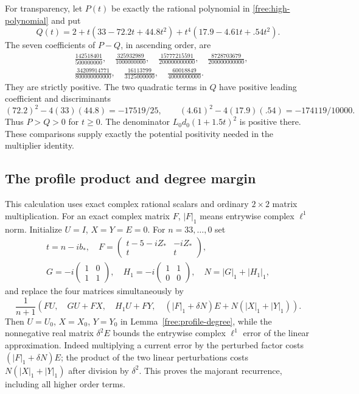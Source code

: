 For transparency, let $P(t)$ be exactly the rational polynomial in
\eqref{free:high-polynomial} and put
\[
 Q(t)=2+t(33-72.2t+44.8t^2)+t^4(17.9-4.61t+.54t^2).
\]
The seven coefficients of $P-Q$, in ascending order, are
\begin{equation}\label{cert:high-difference}
 \begin{split}
 &\frac{142518401}{500000000},\quad
 \frac{325932989}{1000000000},\quad
 \frac{15777215591}{200000000000},\quad
 \frac{8728703679}{200000000000},\\
 &\frac{34209914771}{800000000000},\quad
 \frac{16113799}{3125000000},\quad
 \frac{60018849}{40000000000}.
 \end{split}
\end{equation}
They are strictly positive.  The two quadratic terms in $Q$ have
positive leading coefficient and discriminants
\[
 (72.2)^2-4(33)(44.8)=-17519/25,\qquad
 (4.61)^2-4(17.9)(.54)=-174119/10000.
\]
Thus $P>Q>0$ for $t\ge0$.  The denominator $L_0d_0(1+1.5t)^2$
is positive there.  These comparisons supply exactly the potential
positivity needed in the multiplier identity.

\subsection{The profile product and degree margin}\label{cert:profile}

This calculation uses exact complex rational scalars and ordinary
$2\times2$ matrix multiplication.  For an exact complex matrix $F$,
$|F|_1$ means entrywise complex $\ell^1$ norm.  Initialize
$U=I$, $X=Y=E=0$.  For $n=33,\ldots,0$ set
\[
 \begin{gathered}
 t=n-ib_*,\quad
 F=\begin{pmatrix}t-5-iZ_*&-iZ_*\\t&t\end{pmatrix},\\
 G=-i\begin{pmatrix}1&0\\1&1\end{pmatrix},\quad
 H_1=-i\begin{pmatrix}1&1\\0&0\end{pmatrix},\quad N=|G|_1+|H_1|_1,
 \end{gathered}
\]
and replace the four matrices simultaneously by
\begin{equation}\label{cert:profile-recipe}
 \frac1{n+1}\left(
 FU,\quad GU+FX,\quad H_1U+FY,\quad
 (|F|_1+\delta N)E+N(|X|_1+|Y|_1)\right).
\end{equation}
Then $U=U_0$, $X=X_0$, $Y=Y_0$ in
Lemma~\ref{free:profile-degree}, while the nonnegative real matrix
$\delta^2E$ bounds the entrywise complex $\ell^1$ error of the
linear approximation.  Indeed multiplying a current error by the
perturbed factor costs $(|F|_1+\delta N)E$; the product of the two
linear perturbations costs $N(|X|_1+|Y|_1)$ after division by
$\delta^2$.  This proves the majorant recurrence, including all
higher order terms.

